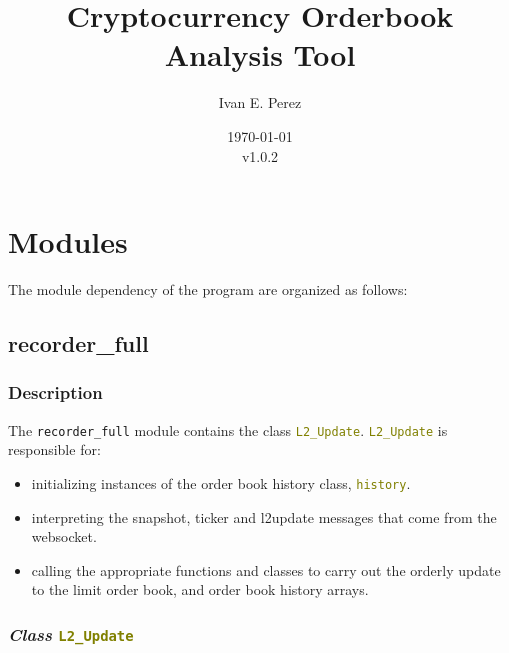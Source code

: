 \documentclass[refman]{article}
\title{Cryptocurrency Orderbook Analysis Tool}
\author{Ivan E. Perez}
\date{\today\\v1.0.2}
\begin{document}
 
\maketitle
{} 
\tableofcontents 

 
\pagestyle{headings} 








\section{Modules}
	The module dependency of the program are organized as follows:


	\subsection{recorder\_full}
	
	\subsubsection{Description}
	
	The \texttt{recorder\_full} module contains the class \textcolor{olive}{\texttt{L2\_Update}}. \textcolor{olive}{\texttt{L2\_Update}} is responsible for:
	\begin{itemize}
		\item initializing instances of the order book history class, \textcolor{olive}{\texttt{history}}.
		\item interpreting the snapshot, ticker and l2update messages that come from the websocket.
		\item calling the appropriate functions and classes to carry out the orderly update to the limit order book, and order book history arrays.
	\end{itemize}

	\subsubsection{\textit{Class} \textcolor{olive}{\texttt{L2\_Update}} }
	
\end{document}
